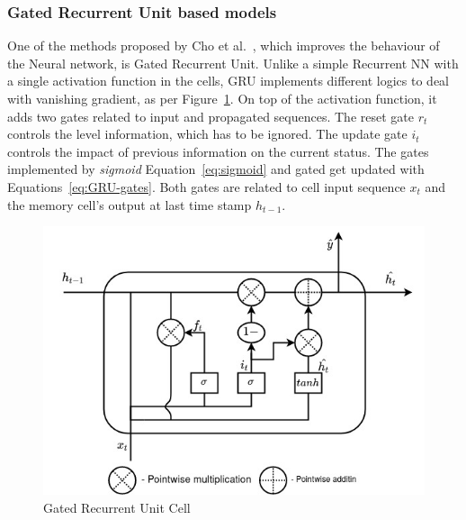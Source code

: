 %
\subsubsection{Gated Recurrent Unit based models} \label{subsub:gru}
One of the methods proposed by Cho et al.~\cite{GRU_cho_properties_2014}, which improves the behaviour of the Neural network, is Gated Recurrent Unit.
Unlike a simple Recurrent NN with a single activation function in the cells, GRU implements different logics to deal with vanishing gradient, as per \mbox{Figure~\ref{fig:GRU-cell}}.
On top of the activation function, it adds two gates related to input and propagated sequences.
The reset gate $r_t$ controls the level information, which has to be ignored.
The update gate $i_t$ controls the impact of previous information on the current status.
The gates implemented by \textit{sigmoid} \mbox{Equation~\ref{eq:sigmoid}} and gated get updated with \mbox{Equations~\ref{eq:GRU-gates}}.
Both gates are related to cell input sequence $x_t$ and the memory cell's output at last time stamp $h_{t-1}$.
\begin{figure}[ht]%
    \centering
    \includegraphics[width=\linewidth]{II_Body/GRU/images/GRU.jpg}
    \caption{Gated Recurrent Unit Cell}
    \label{fig:GRU-cell}
\end{figure}
